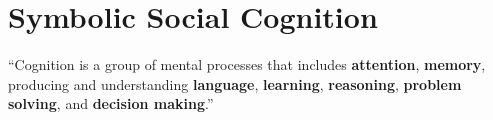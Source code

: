 \documentclass[compress]{beamer}
\begin{document}
%



%
%
%
%
%


\section{Symbolic Social Cognition}




\begin{frame}[plain]{}

        \LARGE

        ``Cognition is a group of mental processes that includes {\bf
        attention}, {\bf memory}, producing and understanding {\bf
        language}, {\bf learning}, {\bf reasoning}, {\bf problem
        solving}, and {\bf decision making}.''

\end{frame}
\end{document}
